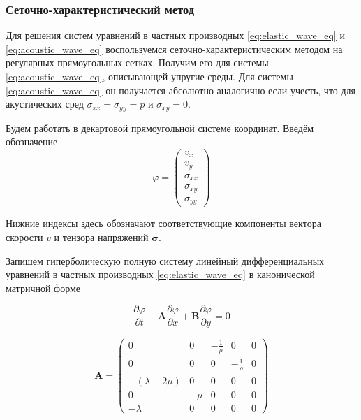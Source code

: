 \subsubsection{Сеточно-характеристический метод}
\label{sec:elastic_gcm}

Для решения систем уравнений в частных производных \eqref{eq:elastic_wave_eq} и \eqref{eq:acoustic_wave_eq} воспользуемся сеточно-характеристическим методом на регулярных прямоугольных сетках. Получим его для системы \eqref{eq:acoustic_wave_eq}, описывающей упругие среды. Для системы \eqref{eq:acoustic_wave_eq} он получается абсолютно аналогично если учесть, что для акустических сред $\sigma_{xx} = \sigma_{yy} = p$ и $\sigma_{xy}=0$.

Будем работать в декартовой прямоугольной системе координат. Введём обозначение 
\begin{equation}
    \varphi = \begin{pmatrix} v_x \\ v_y \\ \sigma_{xx} \\ \sigma_{xy} \\ \sigma_{yy} \end{pmatrix}
\end{equation}

Нижние индексы здесь обозначают соответствующие компоненты вектора скорости $v$ и тензора напряжений $\pmb{\sigma}$.

Запишем гиперболическую полную систему линейный дифференциальных уравнений в частных производных \eqref{eq:elastic_wave_eq} в канонической матричной форме

\begin{equation}
    \dfrac{\partial \varphi}{\partial t} + 
    \pmb{A} \dfrac{\partial \varphi}{\partial x} + 
    \pmb{B} \dfrac{\partial \varphi}{\partial y} = 0
\end{equation}

\begin{equation}
    \pmb{A} = \begin{pmatrix}
        0 & 0 & -\frac{1}{\rho} & 0 & 0 \\
        0 & 0 & 0 & -\frac{1}{\rho} & 0 \\
        -(\lambda+2\mu) & 0 & 0 & 0 & 0 \\
        0 & -\mu & 0 & 0 & 0 \\
        -\lambda & 0 & 0 & 0 & 0
    \end{pmatrix}
\end{equation}

